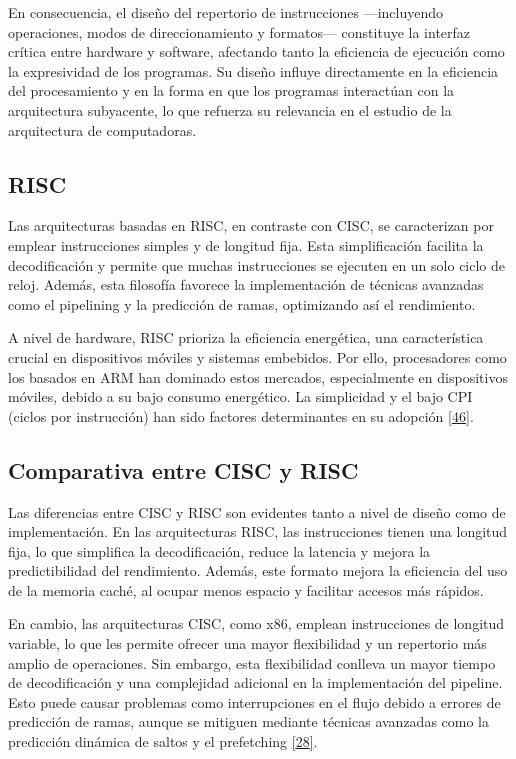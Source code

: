 \documentclass[12pt,oneside]{templates/unerthesis}
\begin{document}
En consecuencia, el diseño del repertorio de instrucciones ---incluyendo operaciones, modos de direccionamiento y formatos--- constituye la interfaz crítica entre hardware y software, afectando tanto la eficiencia de ejecución como la expresividad de los programas. Su diseño influye directamente en la eficiencia del procesamiento y en la forma en que los programas interactúan con la arquitectura subyacente, lo que refuerza su relevancia en el estudio de la arquitectura de computadoras.

\hypertarget{RISC}{%
\subsection{RISC}\label{RISC}}

Las arquitecturas basadas en RISC, en contraste con CISC, se caracterizan por emplear instrucciones simples y de longitud fija. Esta simplificación facilita la decodificación y permite que muchas instrucciones se ejecuten en un solo ciclo de reloj. Además, esta filosofía favorece la implementación de técnicas avanzadas como el pipelining y la predicción de ramas, optimizando así el rendimiento.

A nivel de hardware, RISC prioriza la eficiencia energética, una característica crucial en dispositivos móviles y sistemas embebidos. Por ello, procesadores como los basados en ARM han dominado estos mercados, especialmente en dispositivos móviles, debido a su bajo consumo energético. La simplicidad y el bajo CPI (ciclos por instrucción) han sido factores determinantes en su adopción \protect\hyperlink{ref-hennessy2017computer_riscv}{{[}46{]}}.

\hypertarget{comparativa-entre-cisc-y-risc}{%
\subsection{Comparativa entre CISC y RISC}\label{comparativa-entre-cisc-y-risc}}

Las diferencias entre CISC y RISC son evidentes tanto a nivel de diseño como de implementación. En las arquitecturas RISC, las instrucciones tienen una longitud fija, lo que simplifica la decodificación, reduce la latencia y mejora la predictibilidad del rendimiento. Además, este formato mejora la eficiencia del uso de la memoria caché, al ocupar menos espacio y facilitar accesos más rápidos.

En cambio, las arquitecturas CISC, como x86, emplean instrucciones de longitud variable, lo que les permite ofrecer una mayor flexibilidad y un repertorio más amplio de operaciones. Sin embargo, esta flexibilidad conlleva un mayor tiempo de decodificación y una complejidad adicional en la implementación del pipeline. Esto puede causar problemas como interrupciones en el flujo debido a errores de predicción de ramas, aunque se mitiguen mediante técnicas avanzadas como la predicción dinámica de saltos y el prefetching \protect\hyperlink{ref-tanenbaum_structured_2016}{{[}28{]}}.
\end{document}
